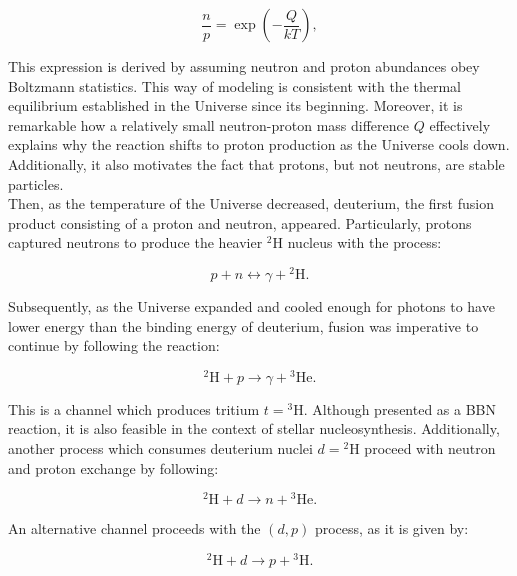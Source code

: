 \documentclass[openany]{book}
\begin{document}
\begin{equation}\label{eq:reaction_neutronProtonRation}
	\frac{n}{p} = \exp {\left(- \frac{Q}{kT}\right)},
\end{equation}

This expression is derived by assuming neutron and proton abundances obey Boltzmann statistics. This way of modeling is consistent with the thermal equilibrium established in the Universe since its beginning. Moreover, it is remarkable how a relatively small neutron-proton mass difference $Q$ effectively explains why the reaction shifts to proton production as the Universe cools down. Additionally, it also motivates the fact that protons, but not neutrons, are stable particles. \\

Then, as the temperature of the Universe decreased, deuterium, the first fusion product consisting of a proton and neutron, appeared. Particularly, protons captured neutrons to produce the heavier $\mathrm{{}^{2}H}$ nucleus with the process:

\begin{equation} \label{eq:reaction_BBN_pn}
	p + n \leftrightarrow \gamma + \mathrm{{}^{2}H}.
\end{equation}

Subsequently, as the Universe expanded and cooled enough for photons to have lower energy than the binding energy of deuterium, fusion was imperative to continue by following the reaction:

\begin{equation} \label{eq:reaction_2Hpradiative}
	\mathrm{{}^{2}H} + p \rightarrow \gamma + \mathrm{{}^{3}He}.
\end{equation}

This is a channel which produces tritium $t = \mathrm{{}^{3}H}$. Although presented as a BBN reaction, it is also feasible in the context of stellar nucleosynthesis. Additionally, another process which consumes deuterium nuclei $d = \mathrm{{}^{2}H}$ proceed with neutron and proton exchange by following:

\begin{equation} \label{eq:reaction_2Hdn}
	\mathrm{{}^{2}H} + d \rightarrow n + \mathrm{{}^{3}He}.
\end{equation}

An alternative channel proceeds with the $(d, p)$ process, as it is given by: 

\begin{equation} \label{eq:reaction_2Hdp}
	\mathrm{{}^{2}H} + d \rightarrow p + \mathrm{{}^{3}H}.
\end{equation}
\end{document}
